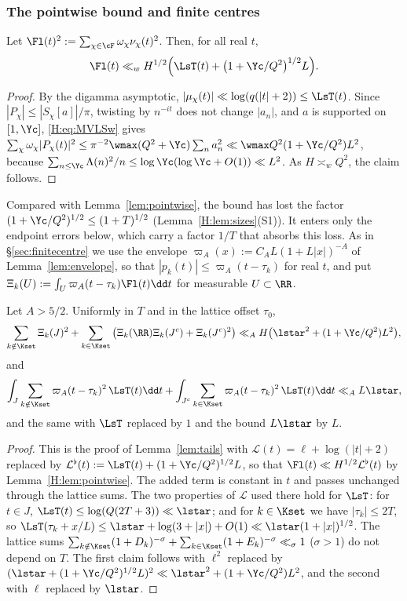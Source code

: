 \subsubsection*{The pointwise bound and finite centres}
\begin{lemma}\label{H:lem:pointwise}
Let $\Fl(t)^2:=\sum_{\chi\in\cF}\omega_\chi\nu_\chi(t)^2$. Then, for all real $t$,
\[
\Fl(t)\ll_wH^{1/2}\Big(\LsT(t)+\big(1+\Yc/Q^2\big)^{1/2}L\Big).
\]
\end{lemma}
\begin{proof}
By the digamma asymptotic, $|\mu_\chi(t)|\ll\log(q(|t|+2))\le\LsT(t)$. Since $|P_\chi|\le|S_\chi[a]|/\pi$, twisting by $n^{-it}$ does not change $|a_n|$, and $a$ is supported on $[1,\Yc]$, \eqref{H:eq:MVLSw} gives $\sum_\chi\omega_\chi|P_\chi(t)|^2\le\pi^{-2}\wmax(Q^2+\Yc)\sum_na_n^2\ll\wmax Q^2(1+\Yc/Q^2)L^2$, because $\sum_{n\le\Yc}\Lambda(n)^2/n\le\log\Yc(\log\Yc+O(1))\ll L^2$. As $H\asymp_wQ^2$, the claim follows.
\end{proof}
Compared with Lemma~\ref{lem:pointwise}, the bound has lost the factor $(1+\Yc/Q^2)^{1/2}\le(1+T)^{1/2}$ (Lemma~\ref{H:lem:sizes}(S1)). It enters only the endpoint errors below, which carry a factor $1/T$ that absorbs this loss. As in \S\ref{sec:finitecentre} we use the envelope $\varpi_A(x):=C_AL(1+L|x|)^{-A}$ of Lemma~\ref{lem:envelope}, so that $|p_k(t)|\le\varpi_A(t-\tau_k)$ for real $t$, and put $\Xi_k(U):=\int_U\varpi_A(t-\tau_k)\Fl(t)\dd t$ for measurable $U\subset\RR$.

\begin{lemma}\label{H:lem:tails}
Let $A>5/2$. Uniformly in $T$ and in the lattice offset $\tau_0$,
\[
\sum_{k\notin\Kset}\Xi_k(J)^2+\sum_{k\in\Kset}\big(\Xi_k(\RR)\Xi_k(J^c)+\Xi_k(J^c)^2\big)\ll_AH\big(\lstar^2+(1+\Yc/Q^2)L^2\big),
\]
and
\[
\int_J\sum_{k\notin\Kset}\varpi_A(t-\tau_k)^2\,\LsT(t)\dd t+\int_{J^c}\sum_{k\in\Kset}\varpi_A(t-\tau_k)^2\,\LsT(t)\dd t\ll_AL\lstar,
\]
and the same with $\LsT$ replaced by $1$ and the bound $L\lstar$ by $L$.
\end{lemma}
\begin{proof}
This is the proof of Lemma~\ref{lem:tails} with $\mathcal L(t)=\ell+\log(|t|+2)$ replaced by $\mathcal L^\flat(t):=\LsT(t)+(1+\Yc/Q^2)^{1/2}L$, so that $\Fl(t)\ll H^{1/2}\mathcal L^\flat(t)$ by Lemma~\ref{H:lem:pointwise}. The added term is constant in $t$ and passes unchanged through the lattice sums. The two properties of $\mathcal L$ used there hold for $\LsT$: for $t\in J$, $\LsT(t)\le\log(Q(2T+3))\ll\lstar$; and for $k\in\Kset$ we have $|\tau_k|\le2T$, so $\LsT(\tau_k+x/L)\le\lstar+\log(3+|x|)+O(1)\ll\lstar(1+|x|)^{1/2}$. The lattice sums $\sum_{k\notin\Kset}(1+D_k)^{-\sigma}+\sum_{k\in\Kset}(1+E_k)^{-\sigma}\ll_\sigma1$ ($\sigma>1$) do not depend on $T$. The first claim follows with $\ell^2$ replaced by $(\lstar+(1+\Yc/Q^2)^{1/2}L)^2\ll\lstar^2+(1+\Yc/Q^2)L^2$, and the second with $\ell$ replaced by $\lstar$.
\end{proof}

